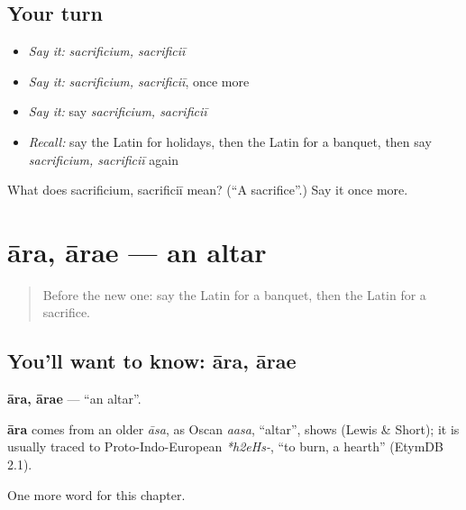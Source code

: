 \subsection*{Your turn}
\begin{itemize}
\raggedright
  \item \emph{Say it:} \emph{sacrificium, sacrificiī}
  \item \emph{Say it:} \emph{sacrificium, sacrificiī}, once more
  \item \emph{Say it:} say \emph{sacrificium, sacrificiī}
  \item \emph{Recall:} say the Latin for holidays, then the Latin for a banquet, then say \emph{sacrificium, sacrificiī} again
\end{itemize}

\begin{tcolorbox}[breakable,colback=teal!4,colframe=teal!35!black,title={Before you move on}]
What does sacrificium, sacrificiī mean? (\textquotedblleft{}A sacrifice\textquotedblright{}.) Say it once more.
\end{tcolorbox}
\section[āra, ārae]{āra, ārae — an altar}

\label{lesson:LA-C253-ara}



\begin{quote}
Before the new one: say the Latin for a banquet, then the Latin for a sacrifice.
\end{quote}

\subsection*{You'll want to know: āra, ārae}
\textbf{āra, ārae} — \textquotedblleft{}an altar\textquotedblright{}.

\begin{cousinweb}
\textbf{āra} comes from an older \emph{āsa}, as Oscan \emph{aasa}, \textquotedblleft{}altar\textquotedblright{}, shows (Lewis \& Short); it is usually traced to Proto-Indo-European \emph{*h2eHs-}, \textquotedblleft{}to burn, a hearth\textquotedblright{} (EtymDB 2.1).
\end{cousinweb}

\begin{grammarlens}[title={What you've built}]
One more word for this chapter.
\end{grammarlens}

